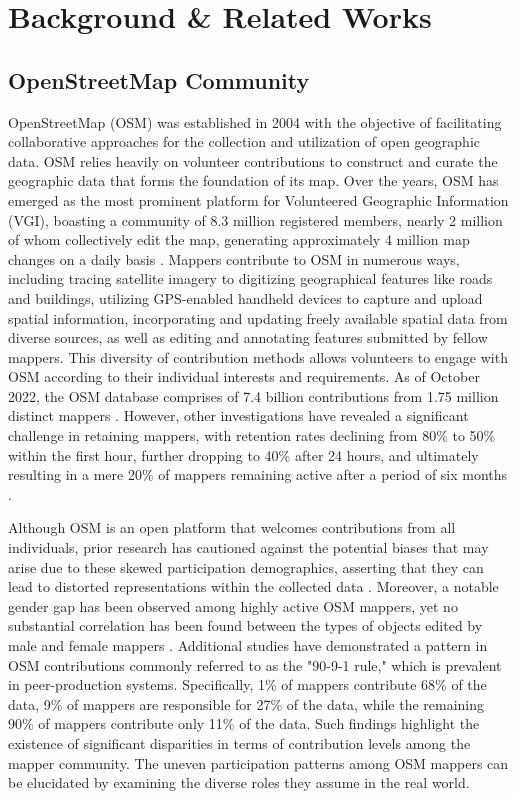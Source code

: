 \documentclass[manuscript,screen,review]{acmart}
\begin{document}
\section{Background \& Related Works}

\subsection{OpenStreetMap Community}

OpenStreetMap (OSM) was established in 2004 with the objective of facilitating collaborative approaches for the collection and utilization of open geographic data\cite{osm-wiki}. OSM relies heavily on volunteer contributions to construct and curate the geographic data that forms the foundation of its map. Over the years, OSM has emerged as the most prominent platform for Volunteered Geographic Information (VGI)\cite{goodchild07}, boasting a community of 8.3 million registered members, nearly 2 million of whom collectively edit the map, generating approximately 4 million map changes on a daily basis \cite{OSM-stats}. Mappers contribute to OSM in numerous ways, including tracing satellite imagery to digitizing geographical features like roads and buildings, utilizing GPS-enabled handheld devices to capture and upload spatial information, incorporating and updating freely available spatial data from diverse sources, as well as editing and annotating features submitted by fellow mappers. This diversity of contribution methods allows volunteers to engage with OSM according to their individual interests and requirements. As of October 2022, the OSM database comprises of 7.4 billion contributions from 1.75 million distinct mappers \cite{OSM-stats}. However, other investigations have revealed a significant challenge in retaining mappers, with retention rates declining from 80\% to 50\% within the first hour, further dropping to 40\% after 24 hours, and ultimately resulting in a mere 20\% of mappers remaining active after a period of six months \cite{BeginDR18}.

Although OSM is an open platform that welcomes contributions from all individuals, prior research has cautioned against the potential biases that may arise due to these skewed participation demographics, asserting that they can lead to distorted representations within the collected data \cite{Stephens13}. Moreover, a notable gender gap has been observed among highly active OSM mappers, yet no substantial correlation has been found between the types of objects edited by male and female mappers \cite{Das19}. Additional studies have demonstrated a pattern in OSM contributions commonly referred to as the "90-9-1 rule," which is prevalent in peer-production systems\cite{BeginDR18}. Specifically, 1\% of mappers contribute 68\% of the data, 9\% of mappers are responsible for 27\% of the data, while the remaining 90\% of mappers contribute only 11\% of the data\cite{BeginDR18}. Such findings highlight the existence of significant disparities in terms of contribution levels among the mapper community. The uneven participation patterns among OSM mappers can be elucidated by examining the diverse roles they assume in the real world. 
\end{document}
